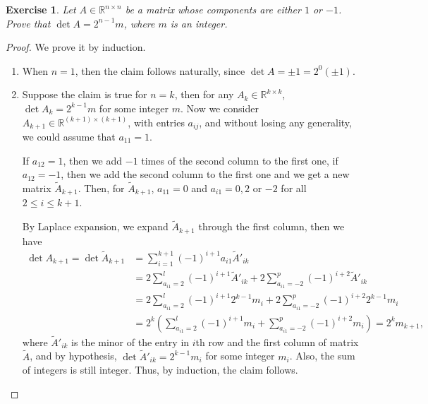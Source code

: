 \documentclass[11pt]{article}
\newtheorem{exercise}{Exercise}[section]
\theoremstyle{definition}
\numberwithin{equation}{subsection}
\begin{document}
\begin{exercise}
Let $A \in \mathbb{R}^{n \times n}$ be a matrix whose components are either $1$ or $-1$. Prove that $\det A = 2^{n-1} m$, where $m$ is an integer.
\end{exercise}
\begin{proof}
We prove it by induction.
\begin{enumerate}[label=(\alph*)]
    \item When $n = 1$, then the claim follows naturally, since $\det A = \pm 1 = 2^{0} (\pm 1)$.
    
    \item Suppose the claim is true for $n = k$, then for any $A_k \in \mathbb{R}^{k \times k}$, $\det A_k = 2^{k-1}m$ for some integer $m$. Now we consider $A_{k+1} \in \mathbb{R}^{(k+1) \times (k+1)}$, with entries $a_{ij}$, and without losing any generality, we could assume that $a_{11} = 1$.
    
    If $a_{12} = 1$, then we add $-1$ times of the second column to the first one, if $a_{12} = -1$, then we add the second column to the first one and we get a new matrix $\widetilde{A}_{k+1}$. Then, for $\widetilde{A}_{k+1}$, $a_{11} = 0$ and $a_{i1} = 0, 2$ or $-2$ for all $2 \leq i \leq k+1$.
    
    By Laplace expansion, we expand $\widetilde{A}_{k+1}$ through the first column, then we have
    \begin{align*}
        \det A_{k+1} = \det \widetilde{A}_{k+1} & = \sum^{k+1}_{i=1} (-1)^{i+1} a_{i1} \widetilde{A}'_{ik} \\
        & = 2 \sum^l_{a_{i1}=2} (-1)^{i+1} \widetilde{A}'_{ik} + 2 \sum^p_{a_{i1}=-2} (-1)^{i+2} \widetilde{A}'_{ik} \\
        & = 2 \sum^l_{a_{i1}=2} (-1)^{i+1} 2^{k-1} m_i + 2 \sum^p_{a_{i1}=-2} (-1)^{i+2} 2^{k-1} m_i \\
        & = 2^k \left(\sum^l_{a_{i1}=2} (-1)^{i+1} m_i + \sum^p_{a_{i1}=-2} (-1)^{i+2} m_i \right) = 2^k m_{k+1},
    \end{align*}
    where $\widetilde{A}'_{ik}$ is the minor of the entry in $i$th row and the first column of matrix $\widetilde{A}$, and by hypothesis, $\det \widetilde{A}'_{ik} = 2^{k-1} m_i$ for some integer $m_i$. Also, the sum of integers is still integer. Thus, by induction, the claim follows.
\end{enumerate}
\end{proof}

\medskip
\end{document}

